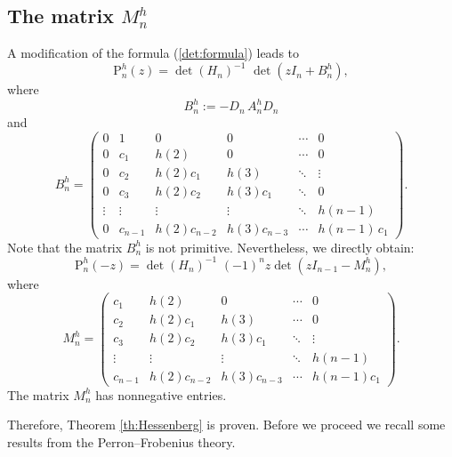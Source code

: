 \documentclass[11pt,reqno]{amsart}
\theoremstyle{plain}
\theoremstyle{remark}
\theoremstyle{definition}
\numberwithin{equation}{section}
\newcommand{\pol}{\mathrm{P}}
\begin{document}
\subsection{The matrix $M_n^h$}

A modification of the formula (\ref{det:formula})
leads to
\begin{equation*} %
\pol _n^h(z) =
\det\left(H_n\right)^{-1}  \,\,\det \left(z I_n +%
B_n^h  \right),
\end{equation*}
where
\begin{equation*}
B_n^{h}:= - D_n \, A_n^{h} D_n
\end{equation*}
and
\[
B_n^{h}=
\begin{pmatrix}
0 & 1 & 0 & 0 & \cdots & 0\\
0 & c_1 & h(2) & 0 & \cdots & 0\\
0 & c_2 & h(2)c_1 & h(3) & \ddots & \vdots \\
0 & c_3 & h(2)c_2 & h(3)c_1 & \ddots & 0 \\
\vdots & \vdots & \vdots & \vdots & \ddots & h(n-1)\\
0 & c_{n-1} & h(2)c_{n-2} & h(3)c_{n-3} & \cdots & h(n-1)\, c_1
\end{pmatrix}.
\]
Note that the matrix $B_n^{h}$ is not primitive. Nevertheless, we directly obtain:
\begin{equation*}
\label{identity}
\pol _n^h(-z) =
\det\left(H_n\right)^{-1}  \,\, (-1)^n z \det \left(z I_{n-1} - 
M_n^h \right),
\end{equation*}
where
\begin{equation} \label{Mn}
M_n^h=
\begin{pmatrix}
c_1 & h(2) & 0 & \cdots & 0\\
c_2 & h(2)c_1 & h(3) & \cdots & 0\\
c_3 & h(2)c_2 & h(3)c_1 & \ddots & \vdots\\
\vdots & \vdots & \vdots & \ddots & h(n-1)\\
c_{n-1} & h(2)c_{n-2} & h(3)c_{n-3} & \cdots & h(n-1)c_1
\end{pmatrix}.
\end{equation}
The matrix 
$M_n^h$
has nonnegative entries. 



Therefore, Theorem \ref{th:Hessenberg} is proven.
Before we proceed we recall some results from the Perron--Frobenius theory.
\end{document}
